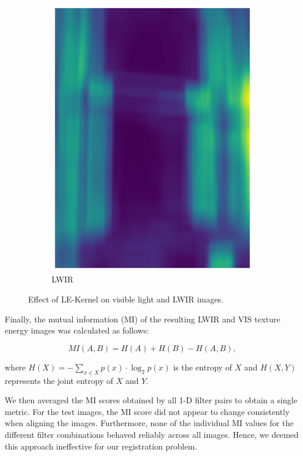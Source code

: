 \documentclass{l4proj}
\begin{document}
\begin{figure}[ht]
\begin{subfigure}[h!]{0.25\textwidth}
    \includegraphics[width=\textwidth]{images/registration/filtered_le_lwir.png}
    \caption{LWIR}
  \end{subfigure}
  \caption{Effect of LE-Kernel \citep{laws_rapid_1980} on visible light and LWIR images.}
  \label{fig:le_filter}
\end{figure}

Finally, the mutual information (MI) of the resulting LWIR and VIS texture energy images was calculated as follows:

\begin{equation}
  MI(A,B) = H(A) + H(B) - H(A,B),
\end{equation}

where $H(X) = - \sum_{x \in X} p(x) \cdot \log_2 p(x)$ is the entropy of $X$ and $H(X,Y)$ represents the joint entropy of $X$ and $Y$.

We then averaged the MI scores obtained by all 1-D filter pairs to obtain a single metric. For the test images, the MI score did not appear to change consistently when aligning the images. Furthermore, none of the individual MI values for the different filter combinations behaved reliably across all images. Hence, we deemed this approach ineffective for our registration problem.
\end{document}
